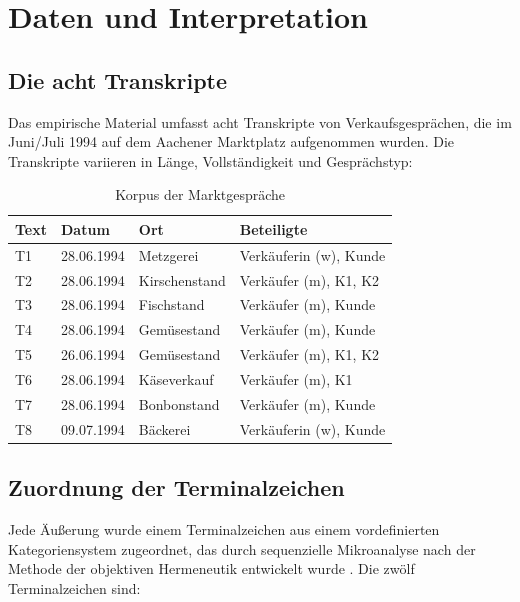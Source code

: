 \documentclass[12pt,a4paper]{article}
\begin{document}
\section{Daten und Interpretation}

\subsection{Die acht Transkripte}

Das empirische Material umfasst acht Transkripte von Verkaufsgesprächen, die
im Juni/Juli 1994 auf dem Aachener Marktplatz aufgenommen wurden. Die Transkripte
variieren in Länge, Vollständigkeit und Gesprächstyp:

\begin{table}[H]
\centering
\caption{Korpus der Marktgespräche}
\label{tab:corpus}
\begin{tabular}{@{} l l l l @{}}
\toprule
\textbf{Text} & \textbf{Datum} & \textbf{Ort} & \textbf{Beteiligte} \\
\midrule
T1 & 28.06.1994 & Metzgerei & Verkäuferin (w), Kunde \\
T2 & 28.06.1994 & Kirschenstand & Verkäufer (m), K1, K2 \\
T3 & 28.06.1994 & Fischstand & Verkäufer (m), Kunde \\
T4 & 28.06.1994 & Gemüsestand & Verkäufer (m), Kunde \\
T5 & 26.06.1994 & Gemüsestand & Verkäufer (m), K1, K2 \\
T6 & 28.06.1994 & Käseverkauf & Verkäufer (m), K1 \\
T7 & 28.06.1994 & Bonbonstand & Verkäufer (m), Kunde \\
T8 & 09.07.1994 & Bäckerei & Verkäuferin (w), Kunde \\
\bottomrule
\end{tabular}
\end{table}

\subsection{Zuordnung der Terminalzeichen}

Jede Äußerung wurde einem Terminalzeichen aus einem vordefinierten Kategoriensystem
zugeordnet, das durch sequenzielle Mikroanalyse nach der Methode der objektiven
Hermeneutik entwickelt wurde \citep{oevermann1979methodology}. Die zwölf
Terminalzeichen sind:
\end{document}
